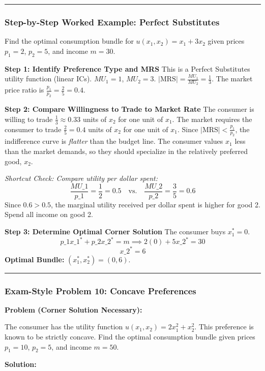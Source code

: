 \documentclass{article}
\begin{document}
\noindent\rule{\linewidth}{0.4pt}

\subsubsection*{Step-by-Step Worked Example: Perfect Substitutes}

Find the optimal consumption bundle for $u(x_1, x_2) = x_1 + 3x_2$ given prices $p_1=2$, $p_2=5$, and income $m=30$.

\textbf{Step 1: Identify Preference Type and MRS} This is a Perfect Substitutes utility function (linear ICs). $MU_1 = 1$, $MU_2 = 3$. $|\text{MRS}| = \frac{MU_1}{MU_2} = \frac{1}{3}$. The market price ratio is $\frac{p_1}{p_2} = \frac{2}{5} = 0.4$.

\textbf{Step 2: Compare Willingness to Trade to Market Rate} The consumer is willing to trade $\frac{1}{3} \approx 0.33$ units of $x_2$ for one unit of $x_1$. The market requires the consumer to trade $\frac{2}{5} = 0.4$ units of $x_2$ for one unit of $x_1$. Since $|\text{MRS}| < \frac{p_1}{p_2}$, the indifference curve is \textit{flatter} than the budget line. The consumer values $x_1$ less than the market demands, so they should specialize in the relatively preferred good, $x_2$.

\textit{Shortcut Check: Compare utility per dollar spent:}
\[ \frac{MU\_1}{p\_1} = \frac{1}{2} = 0.5 \quad \text{vs.} \quad \frac{MU\_2}{p\_2} = \frac{3}{5} = 0.6 \]
Since $0.6 > 0.5$, the marginal utility received per dollar spent is higher for good 2. Spend all income on good 2.

\textbf{Step 3: Determine Optimal Corner Solution} The consumer buys $x_1^*=0$.
\[ p\_1 x\_1^* + p\_2 x\_2^* = m \implies 2(0) + 5x\_2^* = 30 \]
\[ x\_2^* = 6 \]
\textbf{Optimal Bundle:} $(x_1^*, x_2^*) = (0, 6)$.

\noindent\rule{\linewidth}{0.4pt}

\subsubsection*{Exam-Style Problem 10: Concave Preferences}

\textbf{Problem (Corner Solution Necessary):}

The consumer has the utility function $u(x_1, x_2) = 2x_1^2 + x_2^2$. This preference is known to be strictly concave. Find the optimal consumption bundle given prices $p_1=10$, $p_2=5$, and income $m=50$.

\textbf{Solution:}
\end{document}
